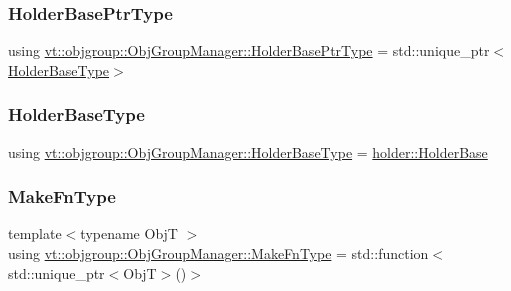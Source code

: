 \subsubsection{\texorpdfstring{Holder\+Base\+Ptr\+Type}{HolderBasePtrType}}
{\footnotesize\ttfamily using \hyperlink{structvt_1_1objgroup_1_1_obj_group_manager_ac1e9bb19d4a5923dd6d595bad28f04c9}{vt\+::objgroup\+::\+Obj\+Group\+Manager\+::\+Holder\+Base\+Ptr\+Type} =  std\+::unique\+\_\+ptr$<$\hyperlink{structvt_1_1objgroup_1_1_obj_group_manager_a4898fc9cabf44890e5593f8c4ab86230}{Holder\+Base\+Type}$>$}

\mbox{\label{structvt_1_1objgroup_1_1_obj_group_manager_a4898fc9cabf44890e5593f8c4ab86230}} 
\subsubsection{\texorpdfstring{Holder\+Base\+Type}{HolderBaseType}}
{\footnotesize\ttfamily using \hyperlink{structvt_1_1objgroup_1_1_obj_group_manager_a4898fc9cabf44890e5593f8c4ab86230}{vt\+::objgroup\+::\+Obj\+Group\+Manager\+::\+Holder\+Base\+Type} =  \hyperlink{structvt_1_1objgroup_1_1holder_1_1_holder_base}{holder\+::\+Holder\+Base}}

\mbox{\label{structvt_1_1objgroup_1_1_obj_group_manager_a397d787b3876752a6d70511b2769b872}} 
\subsubsection{\texorpdfstring{Make\+Fn\+Type}{MakeFnType}}
{\footnotesize\ttfamily template$<$typename ObjT $>$ \\
using \hyperlink{structvt_1_1objgroup_1_1_obj_group_manager_a397d787b3876752a6d70511b2769b872}{vt\+::objgroup\+::\+Obj\+Group\+Manager\+::\+Make\+Fn\+Type} =  std\+::function$<$std\+::unique\+\_\+ptr$<$ObjT$>$()$>$}

\mbox{\label{structvt_1_1objgroup_1_1_obj_group_manager_a4f82f640edf670ba5a282074e5710921}} 
